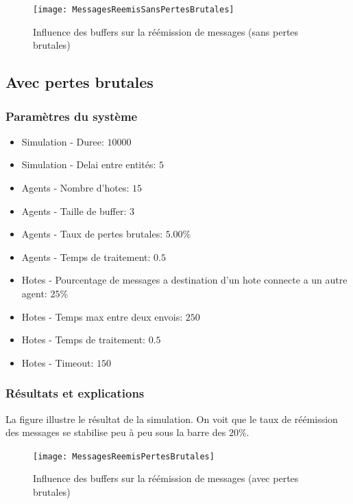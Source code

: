 \documentclass[a4paper,11pt]{article}
\begin{document}
\begin{figure}[h!t]
  \centering
    \texttt{[image: MessagesReemisSansPertesBrutales]}
  \caption{Influence des buffers sur la réémission de messages (sans pertes brutales)}
  \label{fig:messagesreemissanspertesbrutales}
\end{figure}













\subsection{Avec pertes brutales}
\subsubsection{Paramètres du système}
\begin{itemize}
 \item Simulation - Duree: $10000$
 \item Simulation - Delai entre entités: $5$
 \item Agents - Nombre d'hotes: $15$
 \item Agents - Taille de buffer: \textbf{$3$}
 \item Agents - Taux de pertes brutales: $5.00$\%
 \item Agents - Temps de traitement: $0.5$
 \item Hotes - Pourcentage de messages a destination d'un hote connecte a un autre agent: $25$\%
 \item Hotes - Temps max entre deux envois: $250$
 \item Hotes - Temps de traitement: $0.5$
 \item Hotes - Timeout: $150$
\end{itemize}


\subsubsection{Résultats et explications}
La figure  illustre le résultat de la simulation. On voit que le taux de réémission des messages se stabilise peu à peu sous la barre des $20$\%.

\begin{figure}[h!t]
  \centering
    \texttt{[image: MessagesReemisPertesBrutales]}
  \caption{Influence des buffers sur la réémission de messages (avec pertes brutales)}
  \label{fig:messagesreemispertesbrutales}
\end{figure}
\end{document}
